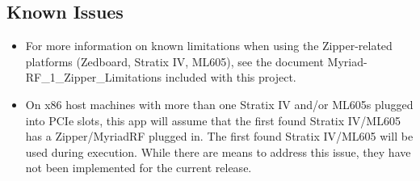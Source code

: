 \subsection{Known Issues}
\noindent
\begin{itemize}
  \item For more information on known limitations when using the Zipper-related platforms (Zedboard, Stratix IV, ML605), see the document Myriad-RF\_1\_Zipper\_Limitations included with this project.
  \item  On x86 host machines with more than one Stratix IV and/or ML605s plugged into PCIe slots, this app will assume that the first found Stratix IV/ML605 has a Zipper/MyriadRF plugged in. The first found Stratix IV/ML605 will be used during execution. While there are means to address this issue, they have not been implemented for the current release.
\end{itemize}

